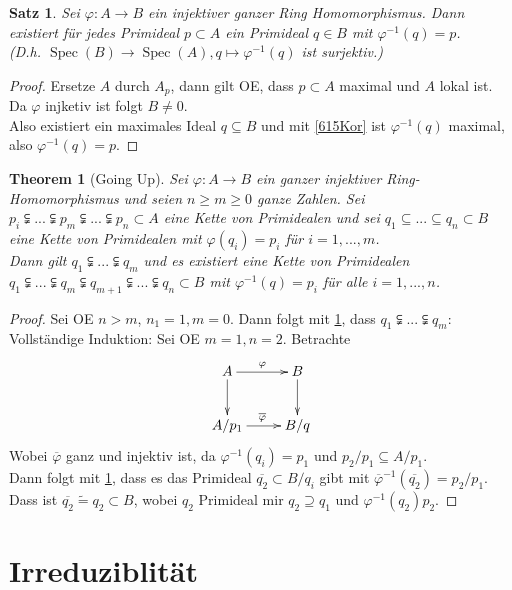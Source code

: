 \documentclass[10pt,a4paper]{article}
\newcommand{\ol}[1]{\overline{#1}}
\newcommand{\isomorph}{\ensuremath{\tilde{=}}}
\newcommand{\Spec}{\ensuremath{\operatorname{Spec}}}
\newcounter{thm}[section]
\theoremstyle{definition}
\theoremstyle{plain}
\newtheorem{satz}[thm]{Satz}
\newtheorem{theorem}[thm]{Theorem}
\theoremstyle{remark}
\begin{document}
\begin{satz}\label{617Satz}
	Sei $\varphi:A\rightarrow B$ ein injektiver ganzer Ring Homomorphismus. Dann existiert für jedes Primideal $p\subset A$ ein Primideal $q\in B$ mit $\varphi^{-1}(q)=p$.\\
	(D.h. $\Spec(B)\rightarrow \Spec(A),q\mapsto \varphi^{-1}(q)$ ist surjektiv.)
\end{satz}
\begin{proof}
	Ersetze $A$ durch $A_p$, dann gilt OE, dass $p\subset A$ maximal und $A$ lokal ist.\\
	Da $\varphi$ injketiv ist folgt $B\neq 0$.\\
	Also existiert ein maximales Ideal $q\subseteq B$ und mit \ref{615Kor} ist $\varphi^{-1}(q)$ maximal, also $\varphi^{-1}(q)=p$.
\end{proof}

\begin{theorem}[Going Up]\label{618ThmGoingUp}
	Sei $\varphi:A\rightarrow B$ ein ganzer injektiver Ring-Homomorphismus und seien $n\geq m\geq 0$ ganze Zahlen. Sei $p_i\subsetneqq...\subsetneqq p_m\subsetneqq...\subsetneqq p_n\subset A$ eine Kette von Primidealen und sei $q_1\subseteq...\subseteq q_n\subset B$ eine Kette von Primidealen mit $\varphi(q_i)=p_i$ für $i=1,...,m$.\\
	Dann gilt $q_1\subsetneqq...\subsetneqq q_m$ und es existiert eine Kette von Primidealen $q_1\subsetneqq...\subsetneqq q_m\subsetneqq q_{m+1}\subsetneqq...\subsetneqq q_n\subset B$ mit $\varphi^{-1}(q)=p_i$ für alle $i=1,...,n$.
\end{theorem}
\begin{proof}
	Sei OE $n>m$, $n_1=1,m=0$. Dann folgt mit \ref{617Satz}, dass $q_1\subsetneqq...\subsetneqq q_m$:\\
	Vollständige Induktion: Sei OE $m=1,n=2$. Betrachte
	\[\xymatrix{
	A\ar[r]^\varphi\ar[d]&B\ar[d]\\
	A/p_1\ar[r]^{\ol{\varphi}}&B/q
	}
	\]
	Wobei $\ol\varphi$ ganz und injektiv ist, da $\varphi^{-1}(q_i)=p_1$ und $p_2/p_1\subseteq A/p_1$.\\
	Dann folgt mit \ref{617Satz}, dass es das Primideal $\ol{q_2}\subset B/q_i$ gibt mit $\ol{\varphi}^{-1}(\ol{q_2})=p_2/p_1$.\\
	Dass ist $\ol{q_2}\isomorph q_2\subset B$, wobei $q_2$ Primideal mir $q_2\supseteq q_1$ und $\varphi^{-1}(q_2)p_2$. 
\end{proof}



\section{Irreduziblität}
\end{document}
